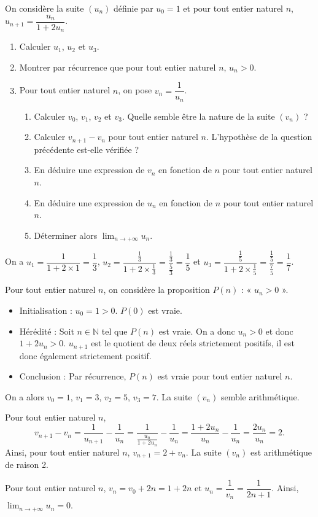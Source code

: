 \documentclass[11pt,fleqn]{book} %
\begin{document}
\begin{exercise}On considère la suite $(u_n)$ définie par $u_0=1$ et pour tout entier naturel $n$, $u_{n+1}=\dfrac{u_n}{1+2u_n}$.

\begin{enumerate}
\item Calculer $u_1$, $u_2$ et $u_3$.
\item Montrer par récurrence que pour tout entier naturel $n$, $u_n >0$.
\item Pour tout entier naturel $n$, on pose $v_n=\dfrac{1}{u_n}$.
\begin{enumerate}
\item Calculer $v_0$, $v_1$, $v_2$ et $v_3$. Quelle semble être la nature de la suite $(v_n)$ ?
\item Calculer $v_{n+1}-v_n$ pour tout entier naturel $n$. L'hypothèse de la question précédente est-elle vérifiée ?
\item En déduire une expression de $v_n$ en fonction de $n$ pour tout entier naturel $n$.
\item En déduire une expression de $u_n$ en fonction de $n$ pour tout entier naturel $n$.
\item Déterminer alors $\displaystyle\lim_{n \to +\infty}u_n$.
\end{enumerate}
\end{enumerate}\end{exercise}
\begin{solution}

On a $u_1=\dfrac{1}{1+2\times 1} = \dfrac{1}{3}$, $u_2=\dfrac{\frac{1}{3}}{1+2 \times \frac{1}{3}}=\dfrac{\frac{1}{3}}{\frac{5}{3}}=\dfrac{1}{5}$ et $u_3=\dfrac{\frac{1}{5}}{1+2 \times \frac{1}{5}}=\dfrac{\frac{1}{5}}{\frac{7}{5}}=\dfrac{1}{7}$.

Pour tout entier naturel $n$, on considère la proposition $P(n)$ : « $u_n >0$ ».
\begin{itemize}
\item Initialisation : $u_0=1>0$. $P(0)$ est vraie.
\item Hérédité : Soit $n\in \mathbb{N}$ tel que $P(n)$ est vraie. On a donc $u_n>0$ et donc $1+2u_n>0$. $u_{n+1}$ est le quotient de deux réels strictement positifs, il est donc également strictement positif.
\item Conclusion : Par récurrence, $P(n)$ est vraie pour tout entier naturel $n$.
\end{itemize}

On a alors $v_0=1$, $v_1=3$, $v_2=5$, $v_3=7$. La suite $(v_n)$ semble arithmétique.

Pour tout entier naturel $n$,
\[v_{n+1}-v_n=\dfrac{1}{u_{n+1}}-\dfrac{1}{u_n}=\dfrac{1}{\frac{u_n}{1+2u_n}}-\frac{1}{u_n}=\dfrac{1+2u_n}{u_n}-\dfrac{1}{u_n}=\dfrac{2u_n}{u_n}=2.\]
Ainsi, pour tout entier naturel $n$, $v_{n+1}=2+v_n$. La suite $(v_n)$ est arithmétique de raison 2.

Pour tout entier naturel  $n$, $v_n=v_0+2n=1+2n$ et $u_n=\dfrac{1}{v_n}=\dfrac{1}{2n+1}$. Ainsi, $\displaystyle\lim_{n \to +\infty}u_n=0$.

\end{solution}
\end{document}
